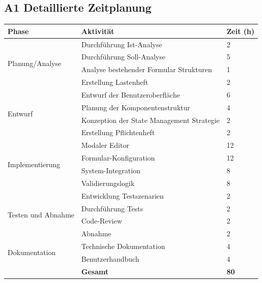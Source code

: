 \documentclass[a4paper,11pt]{article}
\begin{document}
\subsection{A1 Detaillierte Zeitplanung}

\begin{longtable}{lll}
\toprule
\textbf{Phase} & \textbf{Aktivität} & \textbf{Zeit (h)} \\
\midrule
\multirow{4}{*}{Planung/Analyse} & Durchführung Ist-Analyse & 2 \\
 & Durchführung Soll-Analyse & 5 \\
 & Analyse bestehender Formular Strukturen & 1 \\
 & Erstellung Lastenheft & 2 \\
\midrule
\multirow{4}{*}{Entwurf} & Entwurf der Benutzeroberfläche & 6 \\
 & Planung der Komponentenstruktur & 4 \\
 & Konzeption der State Management Strategie & 2 \\
 & Erstellung Pflichtenheft & 2 \\
\midrule
\multirow{4}{*}{Implementierung} & Modaler Editor & 12 \\
 & Formular-Konfiguration & 12 \\
 & System-Integration & 8 \\
 & Validierungslogik & 8 \\
\midrule
\multirow{4}{*}{Testen und Abnahme} & Entwicklung Testszenarien & 2 \\
 & Durchführung Tests & 2 \\
 & Code-Review & 2 \\
 & Abnahme & 2 \\
\midrule
\multirow{2}{*}{Dokumentation} & Technische Dokumentation & 4 \\
 & Benutzerhandbuch & 4 \\
\midrule
 & \textbf{Gesamt} & \textbf{80} \\
\bottomrule
\end{longtable}
\end{document}
